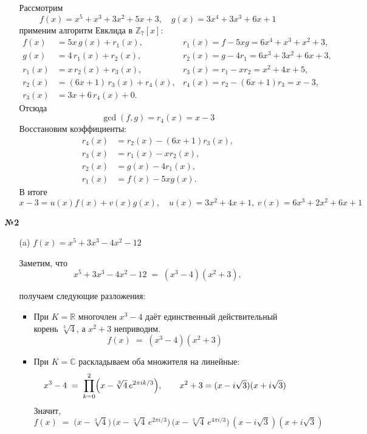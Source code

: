 \documentclass[a4paper]{article}
\begin{document}
\begin{enumerate}
\begin{enumerate}
    Рассмотрим
    \[
    f(x)=x^5+x^3+3x^2+5x+3,\quad g(x)=3x^4+3x^3+6x+1
    \]
    применим алгоритм Евклида в $\mathbb{Z}_7[x]$:
    \begin{align*}
    f(x)&=5x\,g(x) + r_1(x), & r_1(x)=f-5xg=6x^4+x^3+x^2+3,\\
    g(x)&=4\,r_1(x) + r_2(x), & r_2(x)=g-4r_1=6x^3+3x^2+6x+3,\\
    r_1(x)&=x\,r_2(x) + r_3(x), & r_3(x)=r_1-xr_2= x^2+4x+5,\\
    r_2(x)&=(6x+1)\,r_3(x) + r_4(x), & r_4(x)=r_2-(6x+1)r_3= x-3,\\
    r_3(x)&=3x+6\,r_4(x) +0.
    \end{align*}
    Отсюда 
    $$\gcd(f,g)=r_4(x)=x-3$$
    Восстановим коэффициенты:
    \begin{align*}
    r_4(x)&=r_2(x)-(6x+1)r_3(x),\\
    r_3(x)&=r_1(x)-xr_2(x),\\
    r_2(x)&=g(x)-4r_1(x),\\
    r_1(x)&=f(x)-5xg(x).
    \end{align*}
    В итоге
    \[
    x-3=u(x)f(x)+v(x)g(x),\quad u(x)=3x^2+4x+1,\ v(x)=6x^3+2x^2+6x+1
    \]
  \end{enumerate}

  \item[\textbf{№2}]
  \begin{enumerate}
    \item[(a)] \(f(x)=x^5+3x^3-4x^2-12\)
    
    Заметим, что
    \[
      x^5+3x^3-4x^2-12
      \;=\;
      (x^3-4)(x^2+3),
    \]

    получаем следующие разложения:
    \begin{itemize}
      \item При \(K=\mathbb{R}\) многочлен \(x^3-4\) даёт единственный действительный корень \(\sqrt[3]{4}\), а \(x^2+3\) неприводим. 
      \[
        f(x) \;=\; (x^3-4)(x^2+3)
      \]
      \item При \(K=\mathbb{C}\) раскладываем оба множителя на линейные:
      \[
        x^3-4 \;=\;\prod_{k=0}^{2}\Bigl(x-\sqrt[3]{4}\,e^{2\pi i k/3}\Bigr),
        \qquad
        x^2+3=(x-i\sqrt3)(x+i\sqrt3)
      \]
      Значит,
      \[
        f(x)
        \;=\;
        \bigl(x-\sqrt[3]{4}\bigr)\,
        \bigl(x-\sqrt[3]{4}\,e^{2\pi i/3}\bigr)\,
        \bigl(x-\sqrt[3]{4}\,e^{4\pi i/3}\bigr)\,
        (x-i\sqrt3)(x+i\sqrt3)
      \]\\
    \end{itemize}


\end{enumerate}
\end{enumerate}
\end{document}
